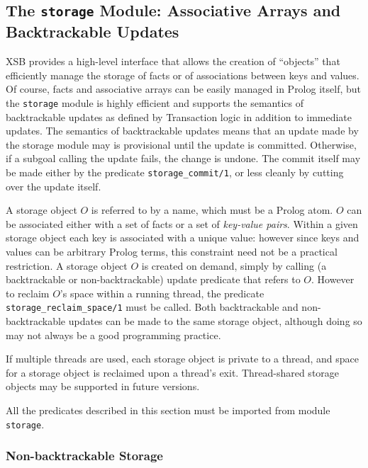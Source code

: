 
\subsection{The {\tt storage} Module: Associative Arrays and Backtrackable Updates}
\label{storage module}

XSB provides a high-level interface that allows the creation of
``objects'' that efficiently manage the storage of facts or of
associations between keys and values.  Of course, facts and
associative arrays can be easily managed in Prolog itself, but the
{\tt storage} module is highly efficient and supports the semantics of
backtrackable updates as defined by Transaction logic \cite{BoKi94} in
addition to immediate updates.  The semantics of backtrackable updates
means that an update made by the storage module may is provisional
until the update is committed.  Otherwise, if a subgoal calling the
update fails, the change is undone. The commit itself may be made
either by the predicate {\tt storage\_commit/1}, or less cleanly by
cutting over the update itself.

A storage object $O$ is referred to by a name, which must be a Prolog
atom.  $O$ can be associated either with a set of facts or a set of
\emph{key-value pairs}.  Within a given storage object each key is
associated with a unique value: however since keys and values can be
arbitrary Prolog terms, this constraint need not be a practical
restriction.  A storage object $O$ is created on demand, simply by
calling (a backtrackable or non-backtrackable) update predicate that
refers to $O$.  However to reclaim $O$'s space within a running
thread, the predicate {\tt storage\_reclaim\_space/1} must be called.
Both backtrackable and non-backtrackable updates can be made to the
same storage object, although doing so may not always be a good
programming practice.

If multiple threads are used, each storage object is private to a
thread, and space for a storage object is reclaimed upon a thread's
exit.  Thread-shared storage objects may be supported in future
versions.

All the predicates described in this section must be imported from
module {\tt storage}.

\subsubsection{Non-backtrackable Storage}


